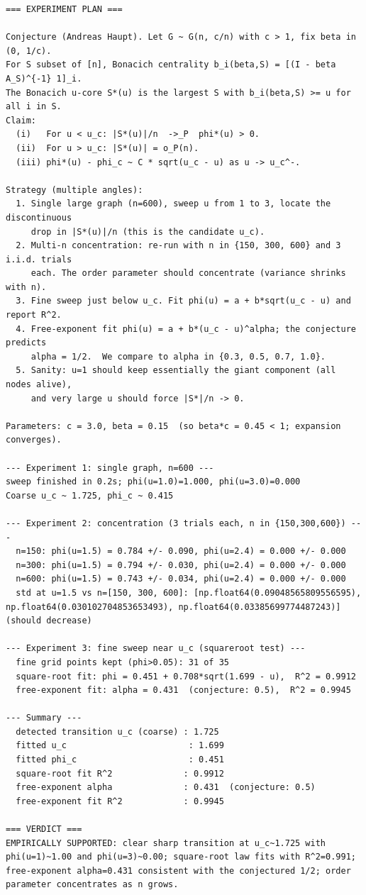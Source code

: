 \documentclass[11pt]{article}
\begin{document}
\begin{lstlisting}
=== EXPERIMENT PLAN ===

Conjecture (Andreas Haupt). Let G ~ G(n, c/n) with c > 1, fix beta in (0, 1/c).
For S subset of [n], Bonacich centrality b_i(beta,S) = [(I - beta A_S)^{-1} 1]_i.
The Bonacich u-core S*(u) is the largest S with b_i(beta,S) >= u for all i in S.
Claim:
  (i)   For u < u_c: |S*(u)|/n  ->_P  phi*(u) > 0.
  (ii)  For u > u_c: |S*(u)| = o_P(n).
  (iii) phi*(u) - phi_c ~ C * sqrt(u_c - u) as u -> u_c^-.

Strategy (multiple angles):
  1. Single large graph (n=600), sweep u from 1 to 3, locate the discontinuous
     drop in |S*(u)|/n (this is the candidate u_c).
  2. Multi-n concentration: re-run with n in {150, 300, 600} and 3 i.i.d. trials
     each. The order parameter should concentrate (variance shrinks with n).
  3. Fine sweep just below u_c. Fit phi(u) = a + b*sqrt(u_c - u) and report R^2.
  4. Free-exponent fit phi(u) = a + b*(u_c - u)^alpha; the conjecture predicts
     alpha = 1/2.  We compare to alpha in {0.3, 0.5, 0.7, 1.0}.
  5. Sanity: u=1 should keep essentially the giant component (all nodes alive),
     and very large u should force |S*|/n -> 0.

Parameters: c = 3.0, beta = 0.15  (so beta*c = 0.45 < 1; expansion converges).

--- Experiment 1: single graph, n=600 ---
sweep finished in 0.2s; phi(u=1.0)=1.000, phi(u=3.0)=0.000
Coarse u_c ~ 1.725, phi_c ~ 0.415

--- Experiment 2: concentration (3 trials each, n in {150,300,600}) ---
  n=150: phi(u=1.5) = 0.784 +/- 0.090, phi(u=2.4) = 0.000 +/- 0.000
  n=300: phi(u=1.5) = 0.794 +/- 0.030, phi(u=2.4) = 0.000 +/- 0.000
  n=600: phi(u=1.5) = 0.743 +/- 0.034, phi(u=2.4) = 0.000 +/- 0.000
  std at u=1.5 vs n=[150, 300, 600]: [np.float64(0.09048565809556595), np.float64(0.030102704853653493), np.float64(0.03385699774487243)] (should decrease)

--- Experiment 3: fine sweep near u_c (squareroot test) ---
  fine grid points kept (phi>0.05): 31 of 35
  square-root fit: phi = 0.451 + 0.708*sqrt(1.699 - u),  R^2 = 0.9912
  free-exponent fit: alpha = 0.431  (conjecture: 0.5),  R^2 = 0.9945

--- Summary ---
  detected transition u_c (coarse) : 1.725
  fitted u_c                        : 1.699
  fitted phi_c                      : 0.451
  square-root fit R^2              : 0.9912
  free-exponent alpha              : 0.431  (conjecture: 0.5)
  free-exponent fit R^2            : 0.9945

=== VERDICT ===
EMPIRICALLY SUPPORTED: clear sharp transition at u_c~1.725 with phi(u=1)~1.00 and phi(u=3)~0.00; square-root law fits with R^2=0.991; free-exponent alpha=0.431 consistent with the conjectured 1/2; order parameter concentrates as n grows.

\end{lstlisting}
\end{document}
